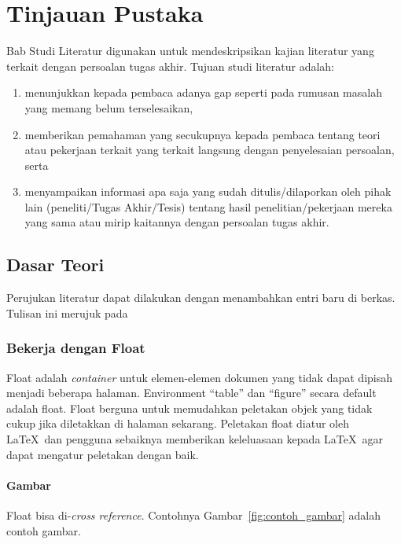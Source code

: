 \chapter{Tinjauan Pustaka}

Bab Studi Literatur digunakan untuk mendeskripsikan kajian literatur yang terkait dengan persoalan tugas akhir. Tujuan studi literatur adalah:

\begin{enumerate}
    \item menunjukkan kepada pembaca adanya gap seperti pada rumusan masalah yang memang belum terselesaikan,
    \item memberikan pemahaman yang secukupnya kepada pembaca tentang teori atau pekerjaan terkait yang terkait langsung dengan penyelesaian persoalan, serta
    \item menyampaikan informasi apa saja yang sudah ditulis/dilaporkan oleh pihak lain (peneliti/Tugas Akhir/Tesis) tentang hasil penelitian/pekerjaan mereka yang sama atau mirip kaitannya dengan persoalan tugas akhir.
\end{enumerate}

\blindtext

\blindtext

\section{Dasar Teori}
Perujukan literatur dapat dilakukan dengan menambahkan entri baru di berkas. Tulisan ini merujuk pada \parencite{knuth2001art}

    \subsection{Bekerja dengan Float}

    Float adalah \textit{container} untuk elemen-elemen dokumen yang tidak dapat dipisah menjadi beberapa halaman. Environment ``table'' dan ``figure'' secara default adalah float. Float berguna untuk memudahkan peletakan objek yang tidak cukup jika diletakkan di halaman sekarang. Peletakan float diatur oleh \LaTeX\ dan pengguna sebaiknya memberikan keleluasaan kepada \LaTeX\ agar dapat mengatur peletakan dengan baik. 
    
    \subsubsection{Gambar}
    
    Float bisa di-\textit{cross reference}. Contohnya Gambar~\ref{fig:contoh_gambar} adalah contoh gambar.


